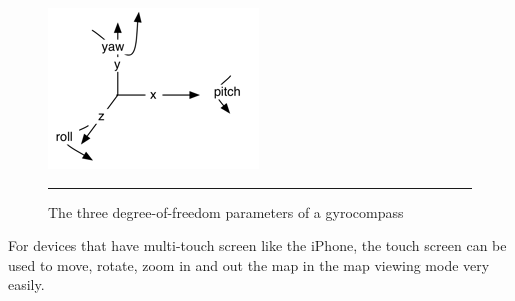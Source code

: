 \begin{figure}[htbp]
	\centering
	\includegraphics{./Primitives/yaw_pitch_roll.png}
	\rule{35em}{0.5pt}
	\caption[The three degree-of-freedom parameters of a gyrocompass]{The three degree-of-freedom parameters of a gyrocompass}
	\label{fig:YawPitchRoll}
\end{figure}

For devices that have multi-touch screen like the iPhone, the touch screen can be used to move, rotate, zoom in and out the map in the map viewing mode very easily.
